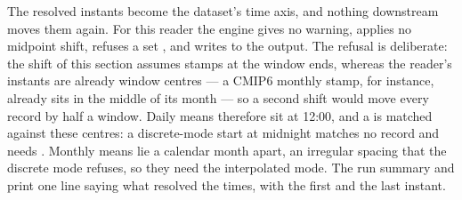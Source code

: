 The resolved instants become the dataset's time axis, and nothing downstream moves them again. For this reader
the engine gives no warning, applies no midpoint shift, refuses a set , and writes
 to the output. The refusal is deliberate: the shift of this
section assumes stamps at the window ends, whereas the reader's instants are already window centres --- a
CMIP6 monthly stamp, for instance, already sits in the middle of its month --- so a second shift would move
every record by half a window. Daily means therefore sit at 12:00, and a  is matched against
these centres: a discrete-mode start at midnight matches no record and needs . Monthly
means lie a calendar month apart, an irregular spacing that the discrete mode refuses, so they need the
interpolated mode. The run summary and  print one line saying what resolved the times, with
the first and the last instant.

